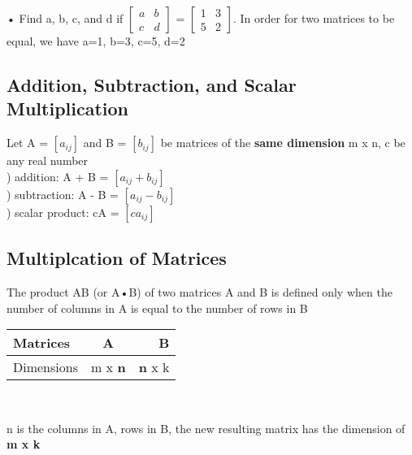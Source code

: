 \documentclass{article}
\begin{document}
• Find a, b, c, and d if 
$\begin{bmatrix}
    a & b \\ 
    c & d
\end{bmatrix}$
= 
$\begin{bmatrix}
    1 & 3 \\ 
    5 & 2
\end{bmatrix}$. 
In order for two matrices to be equal, we have a=1, b=3, c=5, d=2


\subsection{Addition, Subtraction, and Scalar Multiplication}

Let A = $[a_{ij}]$ and B = $[b_{ij}]$ be matrices of the \textbf{same dimension} m x n, c be any real number \\
) addition: A + B = $[a_{ij} + b_{ij}]$ \\
) subtraction: A - B = $[a_{ij} - b_{ij}]$ \\ 
) scalar product: cA = $[ca_{ij}]$

\subsection{Multiplcation of Matrices}
The product AB (or A•B) of two matrices A and B is defined only when the number of columns in A is equal to the number of rows in B 



\begin{center}
  \begin{tabular}{ | l | c | r |}
    \hline
    Matrices & A & B \\ \hline
    Dimensions & m x \textbf{n} & \textbf{n} x k \\ 
    \hline
  \end{tabular} \\
\end{center}
\centerline{n is the columns in A, rows in B, the new resulting matrix has the dimension of \textbf{m x k}} 
\end{document}
